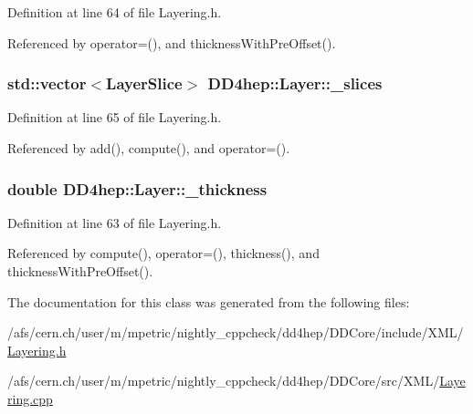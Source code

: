 Definition at line 64 of file Layering.h.

Referenced by operator=(), and thicknessWithPreOffset().\hypertarget{class_d_d4hep_1_1_layer_a45011afeb7fafcefe3de7275a50e5aaf}{
\subsubsection[{\_\-slices}]{\setlength{\rightskip}{0pt plus 5cm}std::vector$<${\bf LayerSlice}$>$ {\bf DD4hep::Layer::\_\-slices}}}
\label{class_d_d4hep_1_1_layer_a45011afeb7fafcefe3de7275a50e5aaf}


Definition at line 65 of file Layering.h.

Referenced by add(), compute(), and operator=().\hypertarget{class_d_d4hep_1_1_layer_afe2f78c9d1a66a6956deded6c4f7a7e1}{
\subsubsection[{\_\-thickness}]{\setlength{\rightskip}{0pt plus 5cm}double {\bf DD4hep::Layer::\_\-thickness}}}
\label{class_d_d4hep_1_1_layer_afe2f78c9d1a66a6956deded6c4f7a7e1}


Definition at line 63 of file Layering.h.

Referenced by compute(), operator=(), thickness(), and thicknessWithPreOffset().

The documentation for this class was generated from the following files:\begin{DoxyCompactItemize}
\item 
/afs/cern.ch/user/m/mpetric/nightly\_\-cppcheck/dd4hep/DDCore/include/XML/\hyperlink{_layering_8h}{Layering.h}\item 
/afs/cern.ch/user/m/mpetric/nightly\_\-cppcheck/dd4hep/DDCore/src/XML/\hyperlink{_layering_8cpp}{Layering.cpp}\end{DoxyCompactItemize}
